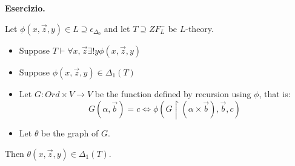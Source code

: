 \documentclass[a4paper,12pt]{article}
\newenvironment{exercise}
  {\par\vspace{1em}\noindent\textbf{Esercizio.} }
  {\par\vspace{1em}}
\begin{document}
\begin{exercise}

	Let $\phi(x,\vec{z},y) \in L \supseteq \epsilon_{\Delta_0}$ and let $T \supseteq ZF^{-}_{L}$ be $L$-theory.
	\begin{itemize}
		\item	Suppose $T \vdash \forall x,\vec{z} \exists ! y \phi(x,\vec{z},y)$ 
		\item   Suppose $\phi(x,\vec{z},y) \in \Delta_1(T)$
		\item 	Let $G: Ord \times V \to V$ be the function defined by recursion using $\phi$, that is:
			\[
				G(\alpha,\vec{b}) = c \iff \phi(G \restriction (\alpha \times {\vec{b}}), \vec{b}, c)
			\]
	       
		\item	Let $\theta$ be the graph of $G$.
  
	\end{itemize}
	Then $\theta(x,\vec{z},y) \in \Delta_1(T)$. 

\end{exercise}
\end{document}
